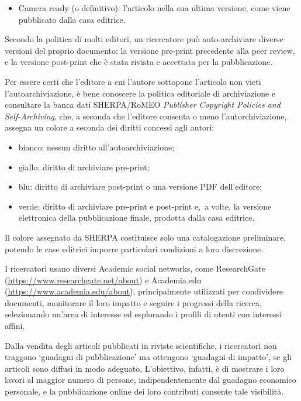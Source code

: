 {\begin{itemize}
\item
  Camera ready (o definitivo): l'articolo nella sua ultima versione,
  come viene pubblicato dalla casa editrice.
\end{itemize}

Secondo la politica di molti editori, un ricercatore può auto-archiviare
diverse versioni del proprio documento: la versione pre-print precedente
alla peer review, e la versione post-print che è stata rivista e
accettata per la pubblicazione.

Per essere certi che l'editore a cui l'autore sottopone l'articolo non
vieti l'autoarchiviazione, è bene conoscere la politica editoriale di
archiviazione e consultare la banca dati SHERPA/RoMEO \emph{Publisher
Copyright Policies and Self-Archiving}, che, a seconda che l'editore
consenta o meno l'autorchiviazione, assegna un colore a seconda dei
diritti concessi agli autori:

\begin{itemize}
\item
  bianco: nessun diritto all'autoarchiviazione;
\item
  giallo: diritto di archiviare pre-print;
\item
  blu: diritto di archiviare post-print o una versione PDF dell'editore;
\item
  verde: diritto di archiviare pre-print e post-print e,~a volte, la
  versione elettronica della pubblicazione finale, prodotta dalla casa
  editrice.
\end{itemize}

Il colore assegnato da SHERPA costituisce solo una catalogazione
preliminare, potendo le case editrici imporre particolari condizioni a
loro discrezione.

I ricercatori usano diversi Academic social networks, come ResearchGate
(\url{https://www.researchgate.net/about})
e Academia.edu
(\url{https://www.academia.edu/about}),
principalmente utilizzati per condividere documenti, monitorare il loro
impatto e seguire i progressi della ricerca, selezionando un'area di
interesse ed esplorando i profili di utenti con interessi affini.

Dalla vendita degli articoli pubblicati in riviste scientifiche, i
ricercatori non traggono `guadagni di pubblicazione' ma ottengono
`guadagni di impatto', se gli articoli sono diffusi in modo adeguato.
L'obiettivo, infatti, è di mostrare i loro lavori al maggior numero di
persone, indipendentemente dal guadagno economico personale, e la
pubblicazione online dei loro contributi consente tale visibilità.

}
